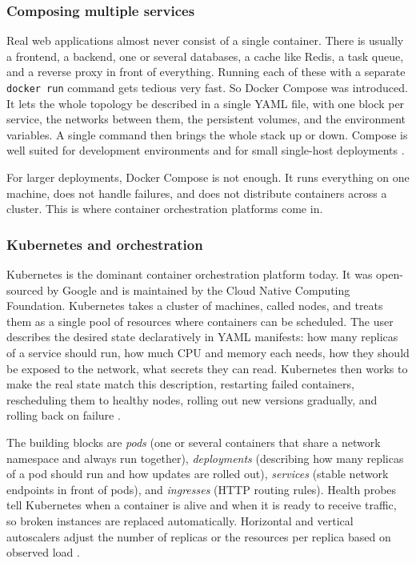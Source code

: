 \subsubsection{Composing multiple services}
\label{sec:compose}

Real web applications almost never consist of a single container. There is usually a frontend, a backend, one or several databases, a cache like Redis, a task queue, and a reverse proxy in front of everything. Running each of these with a separate \texttt{docker run} command gets tedious very fast. So Docker Compose was introduced. It lets the whole topology be described in a single YAML file, with one block per service, the networks between them, the persistent volumes, and the environment variables. A single command then brings the whole stack up or down. Compose is well suited for development environments and for small single-host deployments \autocite{list2018dockercompose, galhotra2025containerization}.

For larger deployments, Docker Compose is not enough. It runs everything on one machine, does not handle failures, and does not distribute containers across a cluster. This is where container orchestration platforms come in.

\subsubsection{Kubernetes and orchestration}
\label{sec:kubernetes}

Kubernetes is the dominant container orchestration platform today. It was open-sourced by Google and is maintained by the Cloud Native Computing Foundation. Kubernetes takes a cluster of machines, called nodes, and treats them as a single pool of resources where containers can be scheduled. The user describes the desired state declaratively in YAML manifests: how many replicas of a service should run, how much CPU and memory each needs, how they should be exposed to the network, what secrets they can read. Kubernetes then works to make the real state match this description, restarting failed containers, rescheduling them to healthy nodes, rolling out new versions gradually, and rolling back on failure \autocite{lakka2025kubernetes, rodriguez2018orchestration, rao2022k8s_cicd}.

The building blocks are \emph{pods} (one or several containers that share a network namespace and always run together), \emph{deployments} (describing how many replicas of a pod should run and how updates are rolled out), \emph{services} (stable network endpoints in front of pods), and \emph{ingresses} (HTTP routing rules). Health probes tell Kubernetes when a container is alive and when it is ready to receive traffic, so broken instances are replaced automatically. Horizontal and vertical autoscalers adjust the number of replicas or the resources per replica based on observed load \autocite{lakka2025kubernetes, aldwyan2021elastic_k8s}.

